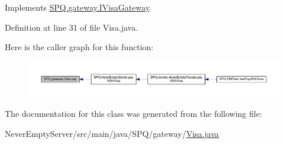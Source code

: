 Implements \mbox{\hyperlink{interface_s_p_q_1_1gateway_1_1_i_visa_gateway_adb8feee5084ca3e28c61360719a24c7a}{S\+P\+Q.\+gateway.\+I\+Visa\+Gateway}}.



Definition at line 31 of file Visa.\+java.

Here is the caller graph for this function\+:\nopagebreak
\begin{figure}[H]
\begin{center}
\leavevmode
\includegraphics[width=350pt]{class_s_p_q_1_1gateway_1_1_visa_a0ecda0414a0685174ec12ae96c8d3a68_icgraph}
\end{center}
\end{figure}


The documentation for this class was generated from the following file\+:\begin{DoxyCompactItemize}
\item 
Never\+Empty\+Server/src/main/java/\+S\+P\+Q/gateway/\mbox{\hyperlink{_visa_8java}{Visa.\+java}}\end{DoxyCompactItemize}
